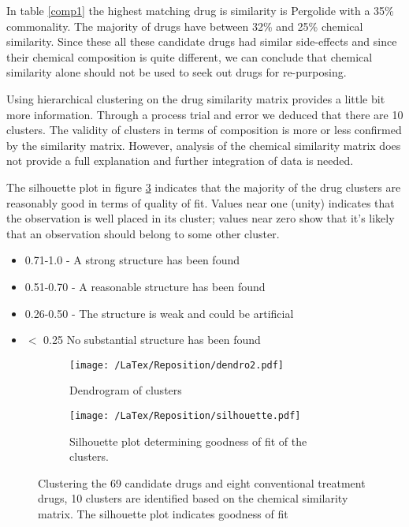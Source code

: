 \documentclass[preprint,11pt]{elsarticle}
\begin{document}
In table \ref{comp1}  the highest matching drug is similarity is  Pergolide with a 35\% commonality. The majority of drugs have between 32\% and 25\% chemical similarity. Since these all these candidate drugs had similar side-effects and since their chemical composition is quite different, we can conclude that chemical similarity alone should not be used to seek out drugs for re-purposing.

Using hierarchical clustering on the drug similarity matrix provides a little bit more information. Through a process trial and error we deduced that there are 10 clusters. The validity of clusters in terms of composition is more or less confirmed by the similarity matrix. However, analysis of the chemical similarity matrix does not provide a full explanation and further integration of data is needed. 

The silhouette plot in figure \ref{fig:sillo} indicates that the majority of the drug clusters are reasonably good in terms of quality of fit. Values near one (unity) indicates  that the observation is well placed in its cluster; values near zero show that it's likely that an observation should belong to some other cluster. 

\begin{itemize}
\item 0.71-1.0  - A strong structure has been found
\item 0.51-0.70 - A reasonable structure has been found
\item 0.26-0.50 - The structure is weak and could be artificial
\item $<$ 0.25 No substantial structure has been found
\end{itemize}


\begin{figure}[h]
  \begin{subfigure}[b]{0.3\textwidth}
    \texttt{[image: /LaTex/Reposition/dendro2.pdf]} %
    \caption{Dendrogram of clusters}
    \label{fig:dendro}
  \end{subfigure}
  \hfill
  \begin{subfigure}[b]{0.5\textwidth}
    \texttt{[image: /LaTex/Reposition/silhouette.pdf]} %
    \caption{Silhouette plot determining goodness of fit of the clusters.}
    \label{fig:sillo}
  \end{subfigure}
  \caption{Clustering the 69 candidate drugs and eight conventional treatment drugs, 10 clusters are identified based on the chemical similarity matrix. The silhouette plot indicates goodness of fit}
\end{figure}
\end{document}
